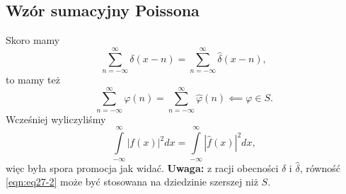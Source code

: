 \documentclass[../main.tex]{subfiles}
\begin{document}
\subsection{Wzór sumacyjny Poissona}
Skoro mamy
\begin{equation}
    \label{eqn:eq27-2}
     \sum_{n=-\infty}^{\infty} \delta(x-n) = \sum_{n=-\infty}^{\infty} \hat{\delta}(x-n)
,\end{equation}
to mamy też
\[
    \sum_{n=-\infty}^{\infty} \varphi(n) = \sum_{n=-\infty}^{\infty} \hat{\varphi}(n) \impliedby \varphi \in S
.\]
Wcześniej wyliczyliśmy
\[
    \int\limits_{-\infty}^{\infty} \left| f(x) \right| ^2 dx = \int\limits_{-\infty}^{\infty} |\hat{f}(x)|^2 dx
,\]
więc była spora promocja jak widać.
\textbf{Uwaga:} z racji obecności $\delta$ i $\hat{\delta}$, równość \eqref{eqn:eq27-2} może być stosowana na dziedzinie szerszej niż $S$.
\end{document}
